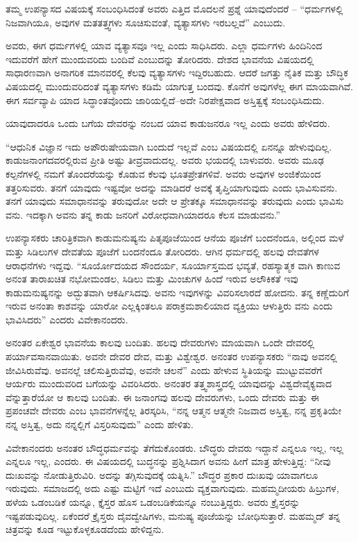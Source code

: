 ತಮ್ಮ ಉಪನ್ಯಾಸದ ವಿಷಯಕ್ಕೆ ಸಂಬಂಧಿಸಿದಂತೆ ಅವರು ಎತ್ತಿದ ಮೊದಲನೆ ಪ್ರಶ್ನೆ ಯಾವುದೆಂದರೆ – “ಧರ್ಮಗಳಲ್ಲಿ ನಿಜವಾಗಿಯೂ, ಅವುಗಳ ಮತತತ್ತ್ವಗಳು ಸೂಚಿಸುವಂತೆ, ವ್ಯತ್ಯಾಸಗಳು ಇರಬಲ್ಲವೆ” ಎಂಬುದು.

ಅವರು, ಈಗ ಧರ್ಮಗಳಲ್ಲಿ ಯಾವ ವ್ಯತ್ಯಾಸವೂ ಇಲ್ಲ ಎಂದು ಸಾಧಿಸಿದರು. ಎಲ್ಲಾ ಧರ್ಮಗಳು ಹಿಂದಿನಿಂದ ಇದುವರೆಗೆ ಹೇಗೆ ಮುಂದುವರಿದು ಬಂದಿವೆ ಎಂಬುದನ್ನು ತೋರಿದರು. ದೇಶದ ಭಾವನೆಯ ವಿಷಯದಲ್ಲಿ ಸಾಧಾರಣವಾಗಿ ಅನಾಗರಿಕ ಮಾನವರಲ್ಲಿ ಕೆಲವು ವ್ಯತ್ಯಾಸಗಳು ಇದ್ದಿರಬಹುದು. ಆದರೆ ಜಗತ್ತು ನೈತಿಕ ಮತ್ತು ಬೌದ್ಧಿಕ ವಿಷಯದಲ್ಲಿ ಮುಂದುವರಿದಂತೆ ವ್ಯತ್ಯಾಸಗಳು ಕಡಿಮೆ ಯಾಗುತ್ತ ಬಂದವು. ಕೊನೆಗೆ ಅವುಗಳೆಲ್ಲ ಈಗ ಮಾಯವಾಗಿವೆ. ಈಗ ಸರ್ವವ್ಯಾಪಿ ಯಾದ ಸಿದ್ಧಾಂತವೊಂದು ಜಾರಿಯಲ್ಲಿದೆ–ಅದೇ ನಿರಪೇಕ್ಷವಾದ ಅಸ್ತಿತ್ವಕ್ಕೆ ಸಂಬಂಧಿಸಿದುದು.

ಯಾವುದಾದರೂ ಒಂದು ಬಗೆಯ ದೇವರನ್ನು ನಂಬದ ಯಾವ ಕಾಡುಜನರೂ ಇಲ್ಲ ಎಂದು ಅವರು ಹೇಳಿದರು.

“ಆಧುನಿಕ ವಿಜ್ಞಾನ ಇದು ಅಪೌರುಷೇಯವಾಗಿ ಬಂದುದೆ ಇಲ್ಲವೆ ಎಂಬ ವಿಷಯದಲ್ಲಿ ಏನನ್ನೂ ಹೇಳುವುದಿಲ್ಲ. ಕಾಡುಜನಾಂಗದವರಲ್ಲಿರುವ ಪ್ರೀತಿ ಅಷ್ಟು ತೀವ್ರವಾದುದಲ್ಲ. ಅವರು ಭಯದಲ್ಲಿ ಬಾಳುವರು. ಅವರು ಮೂಢ ಕಲ್ಪನೆಗಳಲ್ಲಿ ನಮಗೆ ತೊಂದರೆಯನ್ನು ಕೊಡುವ ಕೆಲವು ಭೂತಪ್ರೇತಗಳಿವೆ. ಅವರು ಅವುಗಳ ಅಂಜಿಕೆಯಿಂದ ತತ್ತರಿಸುವರು. ತನಗೆ ಯಾವುದು ಇಷ್ಟವೋ ಅದನ್ನು ಮಾಡಿದರೆ ಅವಕ್ಕೆ ತೃಪ್ತಿಯಾಗುವುದು ಎಂದು ಭಾವಿಸುವನು. ತನಗೆ ಯಾವುದು ಸಮಾಧಾನವನ್ನು ತರುವುದೋ ಅದೇ ಆ ಪ್ರೇತಕ್ಕೂ ಸಮಾಧಾನವನ್ನು ತರುವುದು ಎಂದು ಭಾವಿಸು ವನು. ಇದಕ್ಕಾಗಿ ಅವನು ತನ್ನ ಕಾಡು ಜನರಿಗೆ ವಿರೋಧವಾಗಿಯಾದರೂ ಕೆಲಸ ಮಾಡುವನು.”

ಉಪನ್ಯಾಸಕರು ಚಾರಿತ್ರಿಕವಾಗಿ ಕಾಡುಮನುಷ್ಯನು ಪಿತೃಪೂಜೆಯಿಂದ ಆನೆಯ ಪೂಜೆಗೆ ಬಂದನೆಂದೂ, ಅಲ್ಲಿಂದ ಮಳೆ ಮತ್ತು ಸಿಡಿಲುಗಳ ದೇವತೆಯ ಪೂಜೆಗೆ ಬಂದನೆಂದೂ ತೋರಿದರು. ಆಗಿನ ಧರ್ಮದಲ್ಲಿ ಹಲವು ದೇವತೆಗಳ ಆರಾಧನೆಗಳು ಇದ್ದವು. “ಸೂರ್ಯೋದಯದ ಸೌಂದರ್ಯ, ಸೂರ್ಯಾಸ್ತಮದ ಭವ್ಯತೆ, ರಹಸ್ಯಾತ್ಮಕ ವಾಗಿ ಕಾಣುವ ಅನಂತ ತಾರಾಖಚಿತ ನಭೋಮಂಡಲ, ಸಿಡಿಲು ಮತ್ತು ಮಿಂಚುಗಳ ಹಿಂದೆ ಇರುವ ಅಲೌಕಿಕತೆ ಇವು ಕಾಡುಮನುಷ್ಯನನ್ನು ಅದ್ಭುತವಾಗಿ ಆಕರ್ಷಿಸಿದವು. ಅವನು ಇವುಗಳನ್ನು ವಿವರಿಸಲಾರದೆ ಹೋದನು. ತನ್ನ ಕಣ್ಣೆದುರಿಗೆ ಇರುವ ಅನಂತಾ ಕಾಶವನ್ನು ಯಾರೋ ಎಲ್ಲಕ್ಕಿಂತಲೂ ಪರಾಕ್ರಮಶಾಲಿಯಾದ ವ್ಯಕ್ತಿಯು ಆಳುತ್ತಿರು ವನು ಎಂದು ಭಾವಿಸಿದರು” ಎಂದರು ವಿವೇಕಾನಂದರು.

ಅನಂತರ ಏಕೇಶ್ವರ ಭಾವನೆಯ ಕಾಲವು ಬಂದಿತು. ಹಲವು ದೇವರುಗಳು ಮಾಯವಾಗಿ ಒಂದೇ ದೇವರಲ್ಲಿ ಪರ್ಯಾವಸಾನವಾಯಿತು. ಅವನೇ ದೇವರ ದೇವ, ಮತ್ತು ವಿಶ್ವೇಶ್ವರ. ಅನಂತರ ಉಪನ್ಯಾಸಕರು “ನಾವು ಅವನಲ್ಲಿ ಜೀವಿಸಿರುವೆವು. ಅವನಲ್ಲೆ ಚಲಿಸುತ್ತಿರುವೆವು, ಅವನೇ ಚಲನೆ” ಎಂದು ಹೇಳುವ ಸ್ಥಿತಿಯನ್ನು ಮುಟ್ಟುವವರೆಗೆ ಆರ್ಯರು ಮುಂದುವರಿದ ಬಗೆಯನ್ನು ವಿವರಿಸಿದರು. ಅನಂತರ ತತ್ತ್ವಶಾಸ್ತ್ರದಲ್ಲಿ ಯಾವುದನ್ನು ವಿಶ್ವದೇವೈಕ್ಯವಾದ  ವೆನ್ನುತ್ತಾರೆಯೋ ಆ ಕಾಲವು ಬಂದಿತು. ಈ ಜನಾಂಗವು ಹಲವು ದೇವರುಗಳು, ಒಂದು ದೇವರು ಮತ್ತು ಈ ಪ್ರಪಂಚವೇ ದೇವರು ಎಂಬ ಭಾವನೆಗಳನ್ನೆಲ್ಲ ತಿರಸ್ಕರಿಸಿ, “ನನ್ನ ಆತ್ಮನ ಆತ್ಮನೇ ನಿಜವಾದ ಅಸ್ತಿತ್ವ, ನನ್ನ ಪ್ರಕೃತಿಯೇ ನನ್ನ ಅಸ್ತಿತ್ವ, ಅದು ನನ್ನಲ್ಲಿಗೆ ವಿಸ್ತರಿಸುವುದು” ಎಂದು ಹೇಳಿತು.

ವಿವೇಕಾನಂದರು ಅನಂತರ ಬೌದ್ಧಧರ್ಮವನ್ನು ತೆಗೆದುಕೊಂಡರು. ಬೌದ್ಧರು ದೇವರು ಇದ್ದಾನೆ ಎನ್ನಲೂ ಇಲ್ಲ, ಇಲ್ಲ ಎನ್ನಲೂ ಇಲ್ಲ, ಎಂದರು. ಈ ವಿಷಯದಲ್ಲಿ ಬುದ್ಧನನ್ನು ಪ್ರಶ್ನಿಸಿದಾಗ ಅವನು ಹೀಗೆ ಮಾತ್ರ ಹೇಳುತ್ತಿದ್ದ: “ನೀವು ದುಃಖವನ್ನು ನೋಡುತ್ತಿರುವಿರಿ. ಅದನ್ನು ತಗ್ಗಿಸುವುದಕ್ಕೆ ಯತ್ನಿಸಿ.” ಬೌದ್ಧರ ಪ್ರಕಾರ ದುಃಖವು ಯಾವಾಗಲೂ ಇರುವುದು. ಸಮಾಜದಲ್ಲಿ ಅದು ಎಷ್ಟು ಮಟ್ಟಿಗೆ ಇದೆ ಎಂಬುದು ವ್ಯಕ್ತವಾಗುವುದು. ಮಹಮ್ಮದೀಯರು ಹಿಬ್ರುಗಳ, ಹಳೆಯ ಒಡಂಬಡಿಕೆ ಯನ್ನೂ, ಕ್ತೈಸ್ತರ ಹೊಸ ಒಡಂಬಡಿಕೆಯನ್ನೂ ನಂಬುತ್ತಿದ್ದರು. ಅವರು ಕ್ರೈಸ್ತರನ್ನು ಇಷ್ಟಪಡುವುದಿಲ್ಲ. ಏಕೆಂದರೆ ಕ್ರೈಸ್ತರು ದೈವದ್ವೇಷಿಗಳು, ಮನುಷ್ಯ ಪೂಜೆಯನ್ನು ಬೋಧಿಸುತ್ತಾರೆ. ಮಹಮ್ಮದ್​ ತನ್ನ ಚಿತ್ರವನ್ನು ಕೂಡ ಇಟ್ಟುಕೊಳ್ಳಕೂಡದೆಂದು ಹೇಳಿದ್ದನು.


